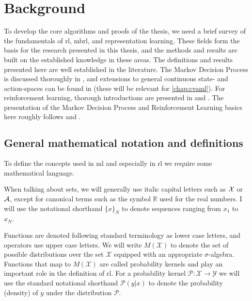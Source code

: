 \chapter{Background}
\label{chap:background}


To develop the core algorithms and proofs of the thesis, we need a brief survey of the fundamentals of \ac{rl}, \ac{mbrl}, and representation learning.
These fields form the basis for the research presented in this thesis, and the methods and results are built on the established knowledge in these areas.
The definitions and results presented here are well established in the literature.
The Markov Decision Process is discussed thoroughly in \parencite{puterman1994markov}, and extensions to general continuous state- and action-spaces can be found in \textcite{bertsekasshreve1978} (these will be relevant for \autoref{chap:cvaml}).
For reinforcement learning, thorough introductions are presented in \textcite{suttonbook} and \textcite{farahmand2021}.
The presentation of the Markov Decision Process and Reinforcement Learning basics here roughly follows \textcite{farahmand2011thesis} and \textcite{farahmand2021}.


\section{General mathematical notation and definitions}
To define the concepts used in \ac{ml} and especially in \ac{rl} we require some mathematical language.

When talking about sets, we will generally use italic capital letters such as $\mathcal{X}$ or $\mathcal{A}$, except for canonical terms such as the symbol $\mathbb{R}$ used for the real numbers.
I will use the notational shorthand $\{x\}_N$ to denote sequences ranging from $x_1$ to $x_N$.

Functions are denoted following standard terminology as lower case letters, and operators use upper case letters.
We will write $M(\mathcal{X})$ to denote the set of possible distributions over the set $\mathcal{X}$ equipped with an appropriate $\sigma$-algebra.
Functions that map to $M(\mathcal{X})$ are called probability kernels and play an important role in the definition of \ac{rl}.
For a probability kernel $\mathcal{P}: \mathcal{X} \rightarrow \mathcal{Y}$ we will use the standard notational shorthand $\mathcal{P}(y|x)$ to denote the probability (density) of $y$ under the distribution $\mathcal{P}$.

